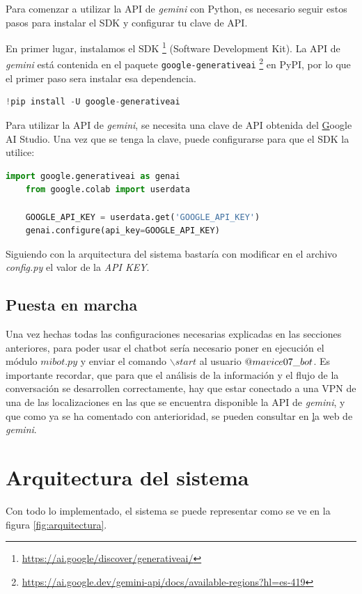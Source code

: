 Para comenzar a utilizar la API de \textit{gemini} con Python, es necesario seguir estos pasos para instalar el SDK y configurar tu clave de API.

En primer lugar, instalamos el SDK \footnote{\url{https://ai.google/discover/generativeai/}} (Software Development Kit). La API de \textit{gemini} está contenida en el paquete \texttt{google-generativeai} \footnote{\url{https://ai.google.dev/gemini-api/docs/available-regions?hl=es-419}} en PyPI, por lo que el primer paso sera instalar esa dependencia.

\begin{lstlisting}[language=Python]
	!pip install -U google-generativeai
\end{lstlisting}

Para utilizar la API de \textit{gemini}, se necesita una clave de API obtenida del \href{https://aistudio.google.com/app/apikey} Google AI Studio. Una vez que se tenga la clave, puede configurarse para que el SDK la utilice:

\begin{lstlisting}[language=Python]
	import google.generativeai as genai
	from google.colab import userdata
	
	GOOGLE_API_KEY = userdata.get('GOOGLE_API_KEY')
	genai.configure(api_key=GOOGLE_API_KEY)
\end{lstlisting}


Siguiendo con la arquitectura del sistema bastaría con modificar en el archivo \textit{config.py} el valor de la \textit{API KEY}.

\subsection{Puesta en marcha} 
Una vez hechas todas las configuraciones necesarias explicadas en las secciones anteriores, para poder usar el chatbot sería necesario poner en ejecución el módulo $mibot.py$ y enviar el comando $\backslash start$ al usuario $\makeatletter @ mavice07\_bot$. Es importante recordar, que para que el análisis de la información y el flujo de la conversación se desarrollen correctamente, hay que estar conectado a una VPN de una de las localizaciones en las que se encuentra disponible la API de \textit{gemini}, y que como ya se ha comentado con anterioridad, se pueden consultar en \href{https://ai.google.dev/gemini-api/docs/available-regions?hl=es-419} la web de \textit{gemini}.
\section{Arquitectura del sistema}
Con todo lo implementado, el sistema se puede representar como se ve en la figura \ref{fig:arquitectura}. 

